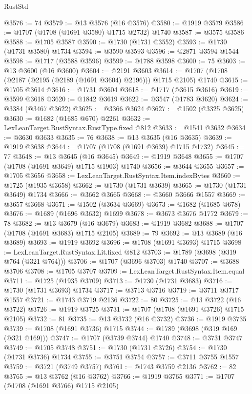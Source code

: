 \begin{lexlean}{RustStd}
\begin{coremodule}
@3576 := 74
@3579 := @13 @3576 (@16 @3576)
@3580 := @1919 @3579
@3586 := @1707 (@1708 (@1691 @3580) @1715 @2732) @1740
@3587 := @3575 @3586
@3588 := @1705 @3587
@3590 := @1730 (@1731 @3552)
@3593 := @1730 (@1731 @3580) @1734
@3594 := @3590 @3593
@3596 := @2871 @3594 @1544
@3598 := @1717 (@3588 @3596)
@3599 := @1788 @3598
@3600 := 75
@3603 := @13 @3600 (@16 @3600)
@3604 := @2191 @3603
@3614 := @1707 (@1708 (@2187 (@2195 (@2189 (@1691 @3604) @2196))) @1715 @2105) @1740
@3615 := @1705 @3614
@3616 := @1731 @3604
@3618 := @1717 (@3615 @3616)
@3619 := @3599 @3618
@3620 := @1842 @3619
@3622 := @3547 (@1783 @3620)
@3624 := @3384 (@3467 @3622)
@3625 := @3366 @3624
@3627 := @1502 (@3325 @3625)
@3630 := @1682 (@1685 @670) @2261
@3632 := LexLeanTarget.RustSyntax.RustType.fixed @812
@3633 := @1541 @3632
@3634 := @3630 @3633
@3635 := 76
@3638 := @13 @3635 (@16 @3635)
@3639 := @1919 @3638
@3644 := @1707 (@1708 (@1691 @3639) @1715 @1732)
@3645 := 77
@3648 := @13 @3645 (@16 @3645)
@3649 := @1919 @3648
@3655 := @1707 (@1708 (@1691 @3649) @1715 @1903) @1740
@3656 := @3644 @3655
@3657 := @1705 @3656
@3658 := LexLeanTarget.RustSyntax.Item.indexBytes
@3660 := @1725 (@1935 @3658)
@3662 := @1730 (@1731 @3639)
@3665 := @1730 (@1731 @3649) @1734
@3666 := @3662 @3665
@3668 := @3660 @3666 @1557
@3669 := @3657 @3668
@3671 := @1502 (@3634 @3669)
@3673 := @1682 (@1685 @678)
@3676 := @1689 (@1696 @3632) @1699
@3678 := @3673 @3676 @1772
@3679 := 78
@3682 := @13 @3679 (@16 @3679)
@3683 := @1919 @3682
@3688 := @1707 (@1708 (@1691 @3683) @1715 @2105)
@3689 := 79
@3692 := @13 @3689 (@16 @3689)
@3693 := @1919 @3692
@3696 := @1708 (@1691 @3693) @1715
@3698 := LexLeanTarget.RustSyntax.Lit.fixed @812
@3703 := @1789 (@3698 (@319 @764 (@321 @764)))
@3706 := @1707 (@3696 @3703) @1740
@3707 := @3688 @3706
@3708 := @1705 @3707
@3709 := LexLeanTarget.RustSyntax.Item.equal
@3711 := @1725 (@1935 @3709)
@3713 := @1730 (@1731 @3683)
@3716 := @1730 (@1731 @3693) @1734
@3717 := @3713 @3716
@3719 := @3711 @3717 @1557
@3721 := @1743 @3719 @2136
@3722 := 80
@3725 := @13 @3722 (@16 @3722)
@3726 := @1919 @3725
@3731 := @1707 (@1708 (@1691 @3726) @1715 @2105)
@3732 := 81
@3735 := @13 @3732 (@16 @3732)
@3736 := @1919 @3735
@3739 := @1708 (@1691 @3736) @1715
@3744 := @1789 (@3698 (@319 @169 (@321 @169)))
@3747 := @1707 (@3739 @3744) @1740
@3748 := @3731 @3747
@3749 := @1705 @3748
@3751 := @1730 (@1731 @3726)
@3754 := @1730 (@1731 @3736) @1734
@3755 := @3751 @3754
@3757 := @3711 @3755 @1557
@3759 := @3721 (@3749 @3757)
@3761 := @1743 @3759 @2136
@3762 := 82
@3765 := @13 @3762 (@16 @3762)
@3766 := @1919 @3765
@3771 := @1707 (@1708 (@1691 @3766) @1715 @2105)

\end{coremodule}
\end{lexlean}
